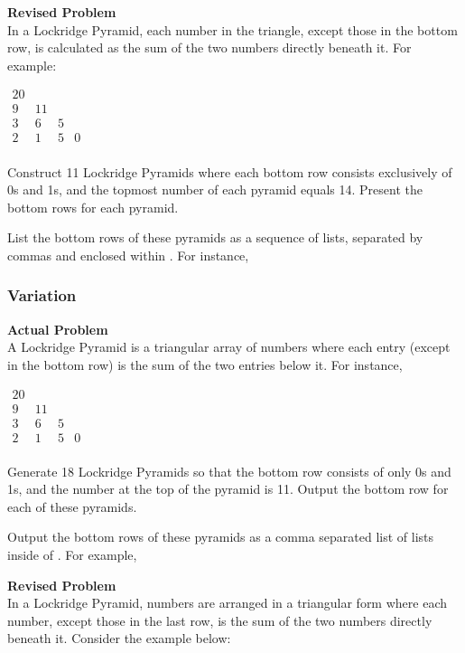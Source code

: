 \textbf{Revised Problem}\\
In a Lockridge Pyramid, each number in the triangle, except those in the bottom row, is calculated as the sum of the two numbers directly beneath it. For example:

$\begin{array}{cccc}
    20 \\
    9 & 11 \\
    3 &  6 & 5 \\
    2 &  1 & 5 & 0 \\
\end{array}$

Construct 11 Lockridge Pyramids where each bottom row consists exclusively of 0s and 1s, and the topmost number of each pyramid equals 14. Present the bottom rows for each pyramid.

List the bottom rows of these pyramids as a sequence of lists, separated by commas and enclosed within . For instance, 

\subsubsection{Variation}
\textbf{Actual Problem}\\
A Lockridge Pyramid is a triangular array of numbers where each entry (except in the bottom row) is the sum of the two entries below it. For instance,

$\begin{array}{cccc}
    20 \\
    9 & 11 \\
    3 &  6 & 5 \\
    2 &  1 & 5 & 0 \\
\end{array}$

Generate 18 Lockridge Pyramids so that the bottom row consists of only 0s and 1s, and the number at the top of the pyramid is 11. Output the bottom row for each of these pyramids.

Output the bottom rows of these pyramids as a comma separated list of lists inside of . For example, 

\textbf{Revised Problem}\\
In a Lockridge Pyramid, numbers are arranged in a triangular form where each number, except those in the last row, is the sum of the two numbers directly beneath it. Consider the example below:

